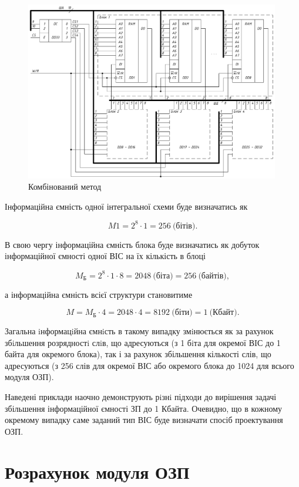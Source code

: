 \begin{figure}[h]
\centering
\includegraphics[width=0.99\textwidth]{img/sch3-crop.pdf}
\caption{Комбінований метод}
\label{fig:sch3}
\end{figure}

Інформаційна ємність одної інтегральної схеми буде визначатись як

$$M1 = 2^{8}\cdot1 = 256~\text{(бітів)}.$$    

В свою чергу інформаційна ємність блока буде визначатись як добуток інформаційної ємності одної ВІС на їх кількість в блоці

$$M_{\text{Б}} = 2^{8}\cdot1\cdot8 = 2048~\text{(біта)} = 256~\text{(байтів)},$$ 

\noindent
а інформаційна ємність всієї структури становитиме 

$$M = M_{\text{Б}}\cdot4 = 2048\cdot4 = 8192~\text{(біти)} = 1~\text{(Кбайт)}.$$

Загальна iнформацiйна ємнiсть в такому випадку змiнюється як за рахунок збiльшення розрядностi слiв, що адресуються (з 1 бiта для окремої ВIС до 1 байта для окремого блока), так і за рахунок збільшення кількості слів, що адресуються (з 256 слів для окремої ВІС або окремого блока до 1024 для всього модуля ОЗП). 

Наведені приклади наочно демонструють рiзнi підходи до вирішення задачі збільшення інформаційної ємності ЗП до 1 Кбайта. Очевидно, що в кожному окремому випадку саме заданий тип ВІС буде визначати спосіб проектування ОЗП.

\section{Розрахунок модуля ОЗП}

